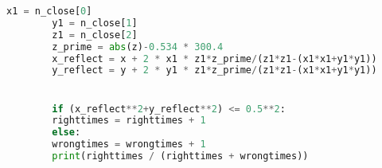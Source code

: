 \documentclass{myclass}
\begin{document}
\begin{appendices}
\begin{lstlisting}[language={python}]
		x1 = n_close[0]
		y1 = n_close[1]
		z1 = n_close[2]
		z_prime = abs(z)-0.534 * 300.4
		x_reflect = x + 2 * x1 * z1*z_prime/(z1*z1-(x1*x1+y1*y1))
		y_reflect = y + 2 * y1 * z1*z_prime/(z1*z1-(x1*x1+y1*y1))


		if (x_reflect**2+y_reflect**2) <= 0.5**2:
		righttimes = righttimes + 1
		else:
		wrongtimes = wrongtimes + 1
		print(righttimes / (righttimes + wrongtimes))

		\end{lstlisting}  %
\end{appendices}
\end{document}
